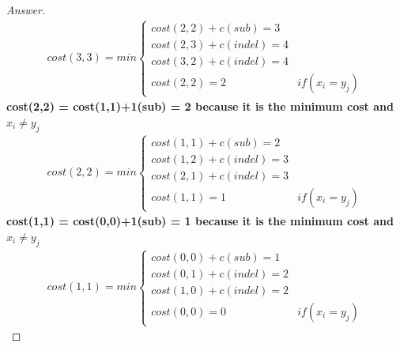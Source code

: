 \documentclass[11pt]{article}
\theoremstyle{definition}
\theoremstyle{definition}
\theoremstyle{definition}
\begin{document}
\begin{proof}[Answer]
\begin{align*}
cost(3,3) = min\begin{cases}
cost(2,2) + c(sub) = 3 \\
cost(2,3) + c(indel) = 4\\
cost(3,2) + c(indel) = 4\\
cost(2,2) = 2 & if (x_i = y_j)
\end{cases}
\end{align*}
\textbf{cost(2,2) = cost(1,1)+1(sub) = 2 because it is the minimum cost and $x_i \neq  y_j$}\\
\begin{align*}
cost(2,2) = min\begin{cases}
cost(1,1) + c(sub) = 2 \\
cost(1,2) + c(indel) = 3\\
cost(2,1) + c(indel) = 3\\
cost(1,1) = 1 & if (x_i = y_j)
\end{cases}
\end{align*}
\textbf{cost(1,1) = cost(0,0)+1(sub) = 1 because it is the minimum cost and $x_i \neq  y_j$}\\
\begin{align*}
cost(1,1) = min\begin{cases}
cost(0,0) + c(sub) = 1 \\
cost(0,1) + c(indel) = 2\\
cost(1,0) + c(indel) = 2\\
cost(0,0) = 0 & if (x_i = y_j)
\end{cases}
\end{align*}
\end{proof}
\end{document}
